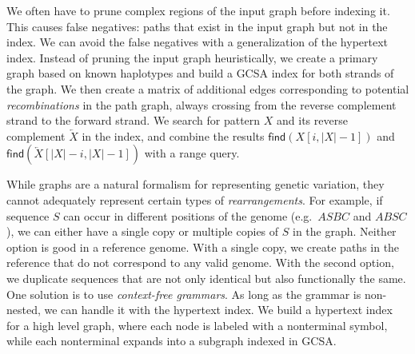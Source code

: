 \documentclass[twoside,leqno,twocolumn]{article}
\newcommand{\abs}[1]{\ensuremath{\lvert #1 \rvert}}
\newcommand{\revcomp}[1]{\ensuremath{\overleftarrow{#1}}}
\newcommand{\find}{\ensuremath{\mathsf{find}}}
\begin{document}
We often have to prune complex regions of the input graph before indexing it. This causes false negatives: paths that exist in the input graph but not in the index. We can avoid the false negatives with a generalization of the hypertext index. Instead of pruning the input graph heuristically, we create a primary graph based on known haplotypes and build a GCSA index for both strands of the graph. We then create a matrix of additional edges corresponding to potential \emph{recombinations} in the path graph, always crossing from the reverse complement strand to the forward strand. We search for pattern $X$ and its reverse complement $\revcomp{X}$ in the index, and combine the results $\find(X[i, \abs{X}-1])$ and $\find(\revcomp{X}[\abs{X}-i, \abs{X}-1])$ with a range query.

While graphs are a natural formalism for representing genetic variation, they cannot adequately represent certain types of \emph{rearrangements}. For example, if sequence $S$ can occur in different positions of the genome (e.g.~$ASBC$ and $ABSC$), we can either have a single copy or multiple copies of $S$ in the graph. Neither option is good in a reference genome. With a single copy, we create paths in the reference that do not correspond to any valid genome. With the second option, we duplicate sequences that are not only identical but also functionally the same. One solution is to use \emph{context-free grammars}. As long as the grammar is non-nested, we can handle it with the hypertext index. We build a hypertext index for a high level graph, where each node is labeled with a nonterminal symbol, while each nonterminal expands into a subgraph indexed in GCSA.
\end{document}
